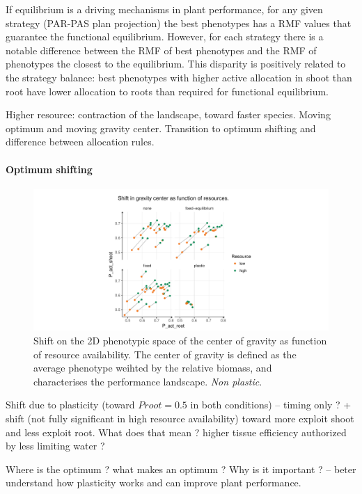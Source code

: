 If equilibrium is a driving mechanisms in plant performance, for any given strategy (PAR-PAS plan projection) the best phenotypes has a RMF values that guarantee the functional equilibrium. However, for each strategy there is a notable difference between the RMF of best phenotypes  and the RMF of phenotypes the closest to the equilibrium. This disparity is positively related to the strategy balance: best phenotypes with higher active allocation in shoot than root have lower allocation to roots than required for functional equilibrium. 

Higher resource: contraction of the landscape, toward faster species. Moving optimum and moving gravity center. Transition to optimum shifting and difference between allocation rules.

\paragraph{Optimum shifting}

\begin{figure}\label{fig:gravity_shift_resource}
\includegraphics[width = \textwidth]{./2_PP/Figures/Landscape/ld_gravity_resourceall.pdf}
\caption{Shift on the 2D phenotypic space of the center of gravity as function of resource availability. The center of gravity is defined as the average phenotype weihted by the relative biomass, and characterises the performance landscape. \textit{Non plastic}.}
\end{figure}

Shift due to plasticity (toward $Proot = 0.5$ in both conditions) -- timing only ?
+ shift (not fully significant in high resource availability) toward more exploit shoot and less exploit root. What does that mean ? higher tissue efficiency authorized by less limiting water ?

Where is the optimum ?  what makes an optimum ? Why is it important ? -- beter understand how plasticity works and can improve plant performance.

